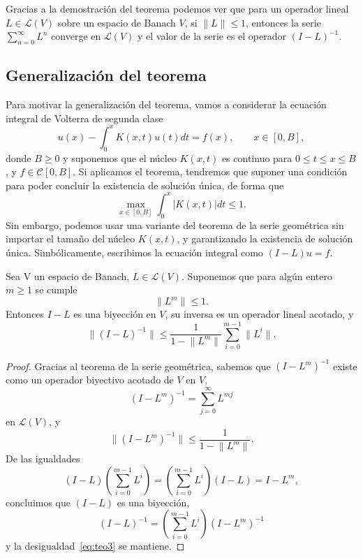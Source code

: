 \begin{observacion}
	Gracias a la demostración del teorema podemos ver que para un operador lineal $L \in \mathcal{L}(V)$ sobre un espacio de Banach $V$, si $\lVert L \rVert \leq 1$, entonces la serie $\sum_{n=0}^{\infty}L^n$ converge en $\mathcal{L}(V)$ y el valor de la serie es el operador $(I-L)^{-1}$.
\end{observacion}
\subsection{Generalización del teorema}
Para motivar la generalización del teorema, vamos a considerar la ecuación integral de Volterra de segunda clase
\begin{equation}
	u(x) - \int_{0}^{x} K(x,t)u(t)dt = f(x), \qquad x \in [0,B],
\end{equation}
donde $B \geq 0$ y suponemos que el núcleo $K(x,t)$ es continuo para $0 \leqslant t \leqslant x \leqslant B$, y $f \in \mathcal{C}[0,B]$. Si aplicamos el teorema, tendremos que suponer una condición para poder concluir la existencia de solución única, de forma que
\begin{equation}
	\max_{x\in [0,B]}\int_{0}^{x} |K(x,t)|dt \leq 1.
\end{equation}
Sin embargo, podemos usar una variante del teorema de la serie geométrica sin importar el tamaño del núcleo $K(x,t)$, y garantizando la existencia de solución única. Simbólicamente, escribimos la ecuación integral como $(I-L)u = f$.
\begin{corolario}
	Sea V un espacio de Banach, $L \in \mathcal{L}(V)$. Suponemos que para algún entero $m \geqslant 1$ se cumple
	\begin{equation}
		\lVert L^m \rVert \leq 1.
	\end{equation}
	Entonces $I - L$ es una biyección en $V$, su inversa es un operador lineal acotado, y 
	\begin{equation}\label{eq:teo3}
		\lVert (I-L)^{-1} \rVert \leqslant \dfrac{1}{1 - \lVert L^m \rVert} \sum_{i=0}^{m - 1}\lVert L^i \rVert.
	\end{equation}
\end{corolario}
\begin{proof}
	Gracias al teorema de la serie geométrica, sabemos que $(I-L^m)^{-1}$ existe como un operador biyectivo acotado de $V$ en $V$,
	\begin{equation}
		(I - L^m)^{-1} = \sum_{j=0}^{\infty}L^{mj} 
	\end{equation}
	en $\mathcal{L}(V)$, y
	\begin{equation}
		\lVert (I - L^m)^{-1} \rVert \leqslant \dfrac{1}{1 - \lVert L^m \rVert}.
	\end{equation}
	De las igualdades
	\begin{equation}
		(I - L)(\sum_{i=0}^{m - 1}L^i) = (\sum_{i=0}^{m - 1}L^i)(I-L) = I - L^m,
	\end{equation}
	concluimos que $(I-L)$ es una biyección,
	\begin{equation}
		(I-L)^{-1} = (\sum_{i=0}^{m-1}L^i)(I-L^m)^{-1}
	\end{equation}
	y la desigualdad~\eqref{eq:teo3} se mantiene.
\end{proof}
